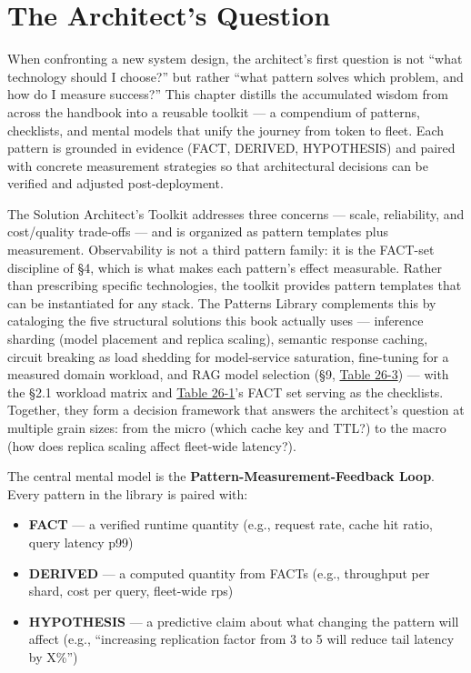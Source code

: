 \section*{The Architect's Question}\label{the-architects-question}

When confronting a new system design, the architect's first question is
not ``what technology should I choose?'' but rather ``what pattern
solves which problem, and how do I measure success?'' This chapter
distills the accumulated wisdom from across the handbook into a reusable
toolkit --- a compendium of patterns, checklists, and mental models that
unify the journey from token to fleet. Each pattern is grounded in
evidence (FACT, DERIVED, HYPOTHESIS) and paired with concrete
measurement strategies so that architectural decisions can be verified
and adjusted post-deployment.

\label{concept}


The Solution Architect's Toolkit addresses three concerns --- scale,
reliability, and cost/quality trade-offs --- and is organized as pattern
templates plus measurement. Observability is not a third pattern family:
it is the FACT-set discipline of §4, which is what makes each pattern's
effect measurable. Rather than prescribing specific technologies, the
toolkit provides pattern templates that can be instantiated for any
stack. The Patterns Library complements this by cataloging the five
structural solutions this book actually uses --- inference sharding
(model placement and replica scaling), semantic response caching,
circuit breaking as load shedding for model-service saturation,
fine-tuning for a measured domain workload, and RAG model selection (§9,
\hyperref[tab:26.3]{Table 26-3}) --- with the §2.1 workload matrix and \hyperref[tab:26.1]{Table 26-1}'s FACT set
serving as the checklists. Together, they form a decision framework that
answers the architect's question at multiple grain sizes: from the micro
(which cache key and TTL?) to the macro (how does replica scaling affect
fleet-wide latency?).

\label{mental-model}


The central mental model is the \textbf{Pattern-Measurement-Feedback
Loop}. Every pattern in the library is paired with:

\begin{itemize}
\tightlist
\item
  \textbf{FACT} --- a verified runtime quantity (e.g., request rate,
  cache hit ratio, query latency p99)
\item
  \textbf{DERIVED} --- a computed quantity from FACTs (e.g., throughput
  per shard, cost per query, fleet-wide rps)
\item
  \textbf{HYPOTHESIS} --- a predictive claim about what changing the
  pattern will affect (e.g., ``increasing replication factor from 3 to 5
  will reduce tail latency by X\%'')
\end{itemize}

